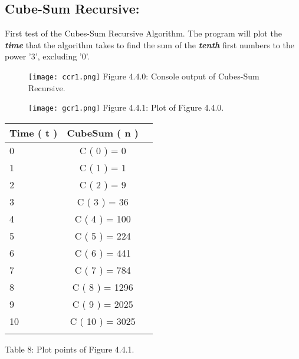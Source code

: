 \documentclass[10pt,a4paper]{article}
\begin{document}
{\bfseries\itshape\color{OliveGreen}{Observation:}} {\itshape{}} \hfill \break

\pagebreak

\subsection{Cube-Sum Recursive:}

First test of the Cubes-Sum Recursive Algorithm. The program will plot the {\bfseries\itshape time} that the algorithm takes to find the sum of the {\bfseries\itshape tenth} first numbers to the power '3', excluding '0'.

\begin{figure}[H]
\texttt{[image: ccr1.png]}
\centering \linebreak \linebreak Figure 4.4.0: Console output of Cubes-Sum Recursive.
\end{figure}

\begin{multicols}{2}
\begin{figure}[H]
\texttt{[image: gcr1.png]}
\centering \linebreak \linebreak Figure 4.4.1: Plot of Figure 4.4.0.
\end{figure}

\begin{center}
\begin{itemize}
\end{itemize}
\begin{tabular}[.5cm]{l c c }
\toprule
Time ( t ) & CubeSum ( n ) \\
\midrule
0 & C ( 0 ) = 0 \\
\cmidrule{1-2}
1 & C ( 1 ) = 1 \\
\cmidrule{1-2}
2 & C ( 2 ) = 9 \\
\cmidrule{1-2}
3 & C ( 3 ) = 36 \\
\cmidrule{1-2}
4 & C ( 4 ) = 100 \\
\cmidrule{1-2}
5 & C ( 5 ) = 224 \\
\cmidrule{1-2}
6 & C ( 6 ) = 441 \\
\cmidrule{1-2}
7 & C ( 7 ) = 784 \\
\cmidrule{1-2}
8 & C ( 8 ) = 1296 \\
\cmidrule{1-2}
9 & C ( 9 ) = 2025 \\
\cmidrule{1-2}
10 & C ( 10 ) = 3025 \\
\bottomrule
\linebreak
\end{tabular}
\linebreak Table 8: Plot points of Figure 4.4.1.
\end{center}
\end{multicols}
\end{document}
